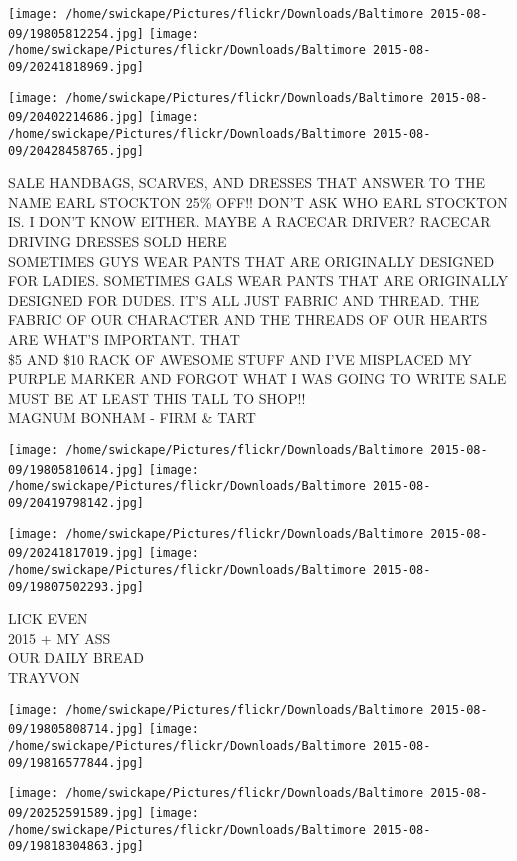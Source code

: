 \documentclass[10pt,letterpaper]{article}
\begin{document}
\texttt{[image: /home/swickape/Pictures/flickr/Downloads/Baltimore 2015-08-09/19805812254.jpg]}
\texttt{[image: /home/swickape/Pictures/flickr/Downloads/Baltimore 2015-08-09/20241818969.jpg]}

\texttt{[image: /home/swickape/Pictures/flickr/Downloads/Baltimore 2015-08-09/20402214686.jpg]}
\texttt{[image: /home/swickape/Pictures/flickr/Downloads/Baltimore 2015-08-09/20428458765.jpg]}

SALE HANDBAGS, SCARVES, AND DRESSES THAT ANSWER TO THE NAME EARL STOCKTON 25\% OFF!!  DON'T ASK WHO EARL STOCKTON IS.  I DON'T KNOW EITHER.  MAYBE A RACECAR DRIVER?  RACECAR DRIVING DRESSES SOLD HERE\\
SOMETIMES GUYS WEAR PANTS THAT ARE ORIGINALLY DESIGNED FOR LADIES.  SOMETIMES GALS WEAR PANTS THAT ARE ORIGINALLY DESIGNED FOR DUDES.  IT'S ALL JUST FABRIC AND THREAD.  THE FABRIC OF OUR CHARACTER AND THE THREADS OF OUR HEARTS ARE WHAT'S IMPORTANT.  THAT\\
\$5 AND \$10 RACK OF AWESOME STUFF AND I'VE MISPLACED MY PURPLE MARKER AND FORGOT WHAT I WAS GOING TO WRITE SALE MUST BE AT LEAST THIS TALL TO SHOP!!\\
MAGNUM BONHAM {-} FIRM \& TART
\pagebreak

\texttt{[image: /home/swickape/Pictures/flickr/Downloads/Baltimore 2015-08-09/19805810614.jpg]}
\texttt{[image: /home/swickape/Pictures/flickr/Downloads/Baltimore 2015-08-09/20419798142.jpg]}

\texttt{[image: /home/swickape/Pictures/flickr/Downloads/Baltimore 2015-08-09/20241817019.jpg]}
\texttt{[image: /home/swickape/Pictures/flickr/Downloads/Baltimore 2015-08-09/19807502293.jpg]}

LICK EVEN\\
2015 + MY ASS\\
OUR DAILY BREAD\\
TRAYVON
\pagebreak

\texttt{[image: /home/swickape/Pictures/flickr/Downloads/Baltimore 2015-08-09/19805808714.jpg]}
\texttt{[image: /home/swickape/Pictures/flickr/Downloads/Baltimore 2015-08-09/19816577844.jpg]}

\texttt{[image: /home/swickape/Pictures/flickr/Downloads/Baltimore 2015-08-09/20252591589.jpg]}
\texttt{[image: /home/swickape/Pictures/flickr/Downloads/Baltimore 2015-08-09/19818304863.jpg]}
\end{document}

